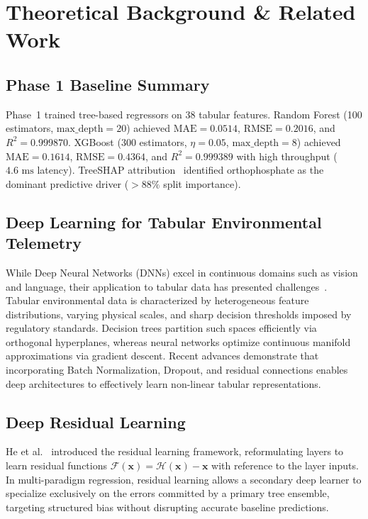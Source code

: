 \documentclass[conference]{IEEEtran}
\begin{document}
\section{Theoretical Background \& Related Work}
\label{sec:related}

\subsection{Phase 1 Baseline Summary}
Phase~1 trained tree-based regressors on 38 tabular features. Random Forest (100 estimators,
$\text{max\_depth}=20$) achieved $\text{MAE} = 0.0514$, $\text{RMSE} = 0.2016$, and
$R^2 = 0.999870$. XGBoost (300 estimators, $\eta = 0.05$, $\text{max\_depth}=8$) achieved
$\text{MAE} = 0.1614$, $\text{RMSE} = 0.4364$, and $R^2 = 0.999389$ with high throughput
($4.6\text{ ms}$ latency). TreeSHAP attribution~\cite{lundberg2017unified,lundberg2020from} identified orthophosphate as the dominant
predictive driver ($> 88\%$ split importance).

\subsection{Deep Learning for Tabular Environmental Telemetry}
While Deep Neural Networks (DNNs) excel in continuous domains such as vision and language,
their application to tabular data has presented challenges~\cite{gorishniy2021revisiting}.
Tabular environmental data is characterized by heterogeneous feature distributions,
varying physical scales, and sharp decision thresholds imposed by regulatory standards.
Decision trees partition such spaces efficiently via orthogonal hyperplanes, whereas
neural networks optimize continuous manifold approximations via gradient descent.
Recent advances demonstrate that incorporating Batch Normalization, Dropout, and
residual connections enables deep architectures to effectively learn non-linear tabular
representations.

\subsection{Deep Residual Learning}
He et al.~\cite{he2016deep} introduced the residual learning framework, reformulating
layers to learn residual functions $\mathcal{F}(\mathbf{x}) = \mathcal{H}(\mathbf{x}) - \mathbf{x}$
with reference to the layer inputs. In multi-paradigm regression, residual learning allows
a secondary deep learner to specialize exclusively on the errors committed by a primary
tree ensemble, targeting structured bias without disrupting accurate baseline predictions.
\end{document}
